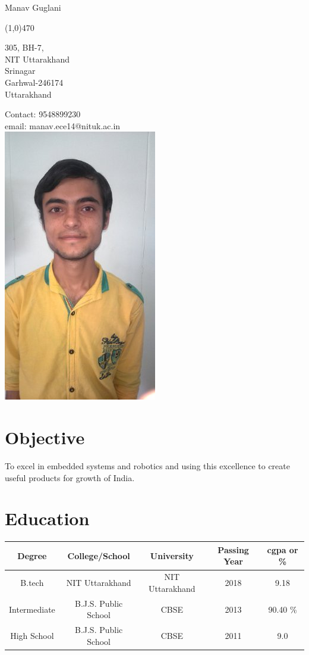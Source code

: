 \documentclass[11pt]{article}
\begin{document}
\centerline{\Large Manav Guglani} 
\noindent 
\line(1,0){470}
\\  
 \parbox[t]{5cm}
{305, BH-7,\\
	NIT Uttarakhand\\
	Srinagar \\
	Garhwal-246174\\
	Uttarakhand}


\hspace{7cm}
\parbox[t]{8cm}
{Contact: 9548899230\\
email:	manav.ece14@nituk.ac.in\\
	\vspace{1pt}
	\includegraphics[scale=.2]{manav.jpg}
}
\section*{Objective}
\Large To excel in embedded systems and robotics and using this excellence to create useful products for growth of India. 
\section*{Education} 
\begin{tabular}{|c|c|c|c|c|}
	\hline
	Degree & College/School & University & Passing Year & cgpa or \% \\
	\hline
	B.tech & NIT Uttarakhand & NIT Uttarakhand & 2018 & 9.18\\
	\hline
	Intermediate & B.J.S. Public School & CBSE & 2013 & 90.40 \% \\
	\hline
	High School & B.J.S. Public School & CBSE & 2011 & 9.0 \\
	\hline
\end{tabular}
\end{document}
